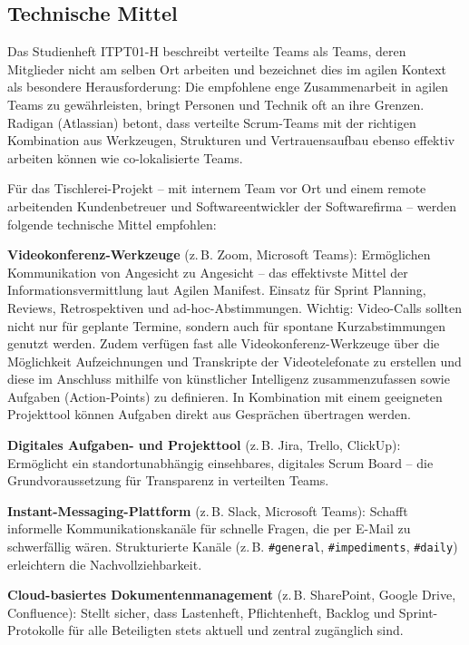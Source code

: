 \documentclass[
    a4paper,
    11pt,
    bibliography=totoc,
    listof=totoc,
    parskip=half,
    headings=normal
]{scrbook}
\begin{document}
\subsection{Technische Mittel}

Das Studienheft ITPT01-H beschreibt verteilte Teams als Teams, deren Mitglieder
nicht am selben Ort arbeiten und bezeichnet dies im agilen Kontext als besondere
Herausforderung: Die empfohlene enge Zusammenarbeit in agilen Teams zu
gewährleisten, bringt Personen und Technik oft an ihre Grenzen\autocite[vgl.][Kap.~5]{Reppin2020}. Radigan\autocite{Radigan2023} (Atlassian) betont,
dass verteilte Scrum-Teams mit der richtigen Kombination aus Werkzeugen,
Strukturen und Vertrauensaufbau ebenso effektiv arbeiten können wie
co-lokalisierte Teams.

Für das Tischlerei-Projekt -- mit internem Team vor Ort und einem remote arbeitenden
Kundenbetreuer und Softwareentwickler der Softwarefirma -- werden folgende
technische Mittel empfohlen:

\textbf{Videokonferenz-Werkzeuge} (z.\,B. Zoom, Microsoft Teams): Ermöglichen
Kommunikation von Angesicht zu Angesicht -- das effektivste Mittel der
Informationsvermittlung laut Agilen Manifest\autocite[vgl.][]{BeckEtAl2001b}.
Einsatz für Sprint Planning, Reviews, Retrospektiven und ad-hoc-Abstimmungen.
Wichtig: Video-Calls sollten nicht nur für geplante Termine, sondern auch
für spontane Kurzabstimmungen genutzt werden\autocite[vgl.][]{Radigan2023}.
Zudem verfügen fast alle Videokonferenz-Werkzeuge über die Möglichkeit Aufzeichnungen und Transkripte der Videotelefonate zu erstellen und diese im Anschluss mithilfe von künstlicher Intelligenz zusammenzufassen sowie Aufgaben (Action-Points) zu definieren. In Kombination mit einem geeigneten Projekttool können Aufgaben direkt aus Gesprächen übertragen werden.

\textbf{Digitales Aufgaben- und Projekttool} (z.\,B. Jira, Trello, ClickUp): Ermöglicht ein
standortunabhängig einsehbares, digitales Scrum Board -- die Grundvoraussetzung
für Transparenz in verteilten Teams\autocite[vgl.][Kap.~5]{Reppin2020}.

\textbf{Instant-Messaging-Plattform} (z.\,B. Slack, Microsoft Teams): Schafft
informelle Kommunikationskanäle für schnelle Fragen, die per E-Mail zu schwerfällig
wären. Strukturierte Kanäle (z.\,B. \texttt{\#general}, \texttt{\#impediments},
\texttt{\#daily}) erleichtern die Nachvollziehbarkeit\autocite[vgl.][]{Radigan2023}.

\textbf{Cloud-basiertes Dokumentenmanagement} (z.\,B. SharePoint, Google Drive,
Confluence): Stellt sicher, dass Lastenheft, Pflichtenheft, Backlog und
Sprint-Protokolle für alle Beteiligten stets aktuell und zentral zugänglich sind.
\end{document}
